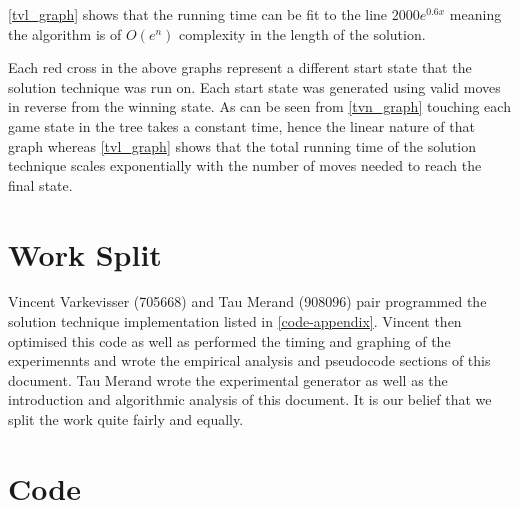 \documentclass[10pt]{article}
\begin{document}
\autoref{tvl_graph} shows that the running time can be fit to the line $2000 e^{0.6x}$ meaning the algorithm is of $O(e^n)$ complexity in the length of the solution.

Each red cross in the above graphs represent a different start state that the solution technique was run on. Each start state was generated using valid moves in reverse from the winning state. As can be seen from \autoref{tvn_graph} touching each game state in the tree takes a constant time, hence the linear nature of that graph whereas \autoref{tvl_graph} shows that the total running time of the solution technique scales exponentially with the number of moves needed to reach the final state.
\newpage
\appendix
\section{Work Split}
Vincent Varkevisser (705668) and Tau Merand (908096) pair programmed the solution technique implementation listed in \autoref{code-appendix}. Vincent then optimised this code as well as performed the timing and graphing of the experimennts and wrote the empirical analysis and pseudocode sections of this document. Tau Merand wrote the experimental generator as well as the introduction and algorithmic analysis of this document. It is our belief that we split the work quite fairly and equally.
\section{Code}\label{code-appendix}

\newpage

\newpage

\newpage

\end{document}
